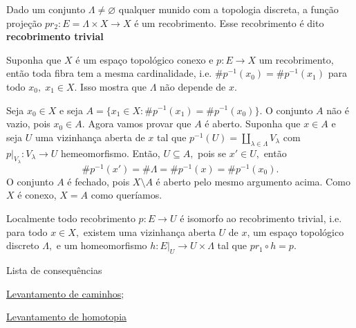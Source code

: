 \begin{ex}
    Dado um conjunto $\Lambda\ne \varnothing$ qualquer munido com a topologia discreta, a função projeção $pr_2:E=\Lambda\times X\rightarrow X$ é um recobrimento. Esse recobrimento é dito \textbf{recobrimento trivial}
\end{ex}

\begin{prop}
    Suponha que $X$ é um espaço topológico conexo e $p:E\rightarrow X$ um recobrimento, então toda fibra tem a mesma cardinalidade, i.e. $\# p^{-1}(x_0)=\# p^{-1}(x_1)$ para todo $x_0,\;x_1\in X.$ Isso mostra que $\Lambda$ não depende de $x$.
\end{prop}

\begin{dem}
    Seja $x_0\in X$ e seja $A=\{x_1\in X: \#p^{-1}(x_1)=\# p^{-1}(x_0)\}.$ O conjunto $A$ não é vazio, pois $x_0\in A.$ Agora vamos provar que $A$ é aberto. Suponha que $x\in A$ e seja $U$ uma vizinhança aberta de $x$ tal que $p^{-1}(U)=\amalg_{\lambda\in \Lambda} V_\lambda$ com $p|_{V_\lambda}:V_\lambda\rightarrow U$ hemeomorfismo. Então, $U\subseteq A,$ pois se $x'\in U,$ então 
    $$\# p^{-1}(x')=\# \Lambda=\# p^{-1}(x)=\# p^{-1}(x_0).$$
    O conjunto $A$ é fechado, pois $X\setminus A$ é aberto pelo mesmo argumento acima. Como $X$ é conexo, $X=A$ como queríamos. 
\end{dem}

\begin{nota}
    Localmente todo recobrimento $p:E\rightarrow U$ é isomorfo ao recobrimento trivial, i.e. para todo $x\in X,$ existem uma vizinhança aberta $U$ de $x$, um espaço topológico discreto $\Lambda,$ e um homeomorfismo $h: E|_U\rightarrow U\times \Lambda$ tal que $pr_1\circ h= p.$
\end{nota}

\begin{titlemize}{Lista de consequências}
	\item \hyperref[levantamento-de-caminhos-prop]{Levantamento de caminhos};\\ %
	\item \hyperref[levantamento-de-homotopia-prop]{Levantamento de homotopia}
\end{titlemize}
